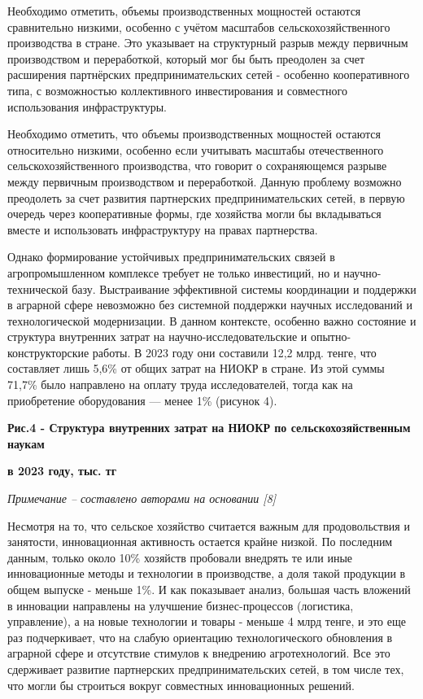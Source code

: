 Необходимо отметить, объемы производственных мощностей остаются
сравнительно низкими, особенно с учётом масштабов сельскохозяйственного
производства в стране. Это указывает на структурный разрыв между
первичным производством и переработкой, который мог бы быть преодолен за
счет расширения партнёрских предпринимательских сетей - особенно
кооперативного типа, с возможностью коллективного инвестирования и
совместного использования инфраструктуры.

Необходимо отметить, что объемы производственных мощностей остаются
относительно низкими, особенно если учитывать масштабы отечественного
сельскохозяйственного производства, что говорит о сохраняющемся разрыве
между первичным производством и переработкой. Данную проблему возможно
преодолеть за счет развития партнерских предпринимательских сетей, в
первую очередь через кооперативные формы, где хозяйства могли бы
вкладываться вместе и использовать инфраструктуру на правах партнерства.

Однако формирование устойчивых предпринимательских связей в
агропромышленном комплексе требует не только инвестиций, но и
научно-технической базу. Выстраивание эффективной системы координации и
поддержки в аграрной сфере невозможно без системной поддержки научных
исследований и технологической модернизации. В данном контексте,
особенно важно состояние и структура внутренних затрат на
научно-исследовательские и опытно-конструкторские работы. В 2023 году
они составили 12,2 млрд. тенге, что составляет лишь 5,6\% от общих
затрат на НИОКР в стране. Из этой суммы 71,7\% было направлено на оплату
труда исследователей, тогда как на приобретение оборудования --- менее
1\% (рисунок 4).

{\bfseries Рис.4 - Структура внутренних затрат на НИОКР по
сельскохозяйственным наукам}

{\bfseries в 2023 году, тыс. тг}

\emph{Примечание -- составлено авторами на основании {[}8{]}}

Несмотря на то, что сельское хозяйство считается важным для
продовольствия и занятости, инновационная активность остается крайне
низкой. По последним данным, только около 10\% хозяйств пробовали
внедрять те или иные инновационные методы и технологии в производстве, а
доля такой продукции в общем выпуске - меньше 1\%. И как показывает
анализ, большая часть вложений в инновации направлены на улучшение
бизнес-процессов (логистика, управление), а на новые технологии и товары
- меньше 4 млрд тенге, и это еще раз подчеркивает, что на слабую
ориентацию технологического обновления в аграрной сфере и отсутствие
стимулов к внедрению агротехнологий. Все это сдерживает развитие
партнерских предпринимательских сетей, в том числе тех, что могли бы
строиться вокруг совместных инновационных решений.

